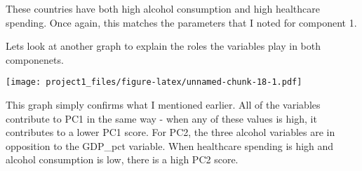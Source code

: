\documentclass[]{article}
\newenvironment{Shaded}{\begin{snugshade}}{\end{snugshade}}
\newcommand{\KeywordTok}[1]{\textcolor[rgb]{0.13,0.29,0.53}{\textbf{#1}}}
\newcommand{\DataTypeTok}[1]{\textcolor[rgb]{0.13,0.29,0.53}{#1}}
\newcommand{\DecValTok}[1]{\textcolor[rgb]{0.00,0.00,0.81}{#1}}
\newcommand{\FloatTok}[1]{\textcolor[rgb]{0.00,0.00,0.81}{#1}}
\newcommand{\StringTok}[1]{\textcolor[rgb]{0.31,0.60,0.02}{#1}}
\newcommand{\OperatorTok}[1]{\textcolor[rgb]{0.81,0.36,0.00}{\textbf{#1}}}
\newcommand{\NormalTok}[1]{#1}
\begin{document}
These countries have both high alcohol consumption and high healthcare
spending. Once again, this matches the parameters that I noted for
component 1.

Lets look at another graph to explain the roles the variables play in
both componenets.

\begin{Shaded}
\end{Shaded}

\texttt{[image: project1\_files/figure-latex/unnamed-chunk-18-1.pdf]}

This graph simply confirms what I mentioned earlier. All of the
variables contribute to PC1 in the same way - when any of these values
is high, it contributes to a lower PC1 score. For PC2, the three alcohol
variables are in opposition to the GDP\_pct variable. When healthcare
spending is high and alcohol consumption is low, there is a high PC2
score.
\end{document}

